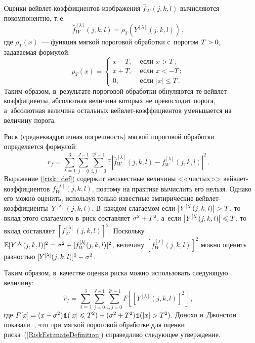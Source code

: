 \begin{multicols}{2}
Оценки вейвлет-коэффициентов изображения $\hat{f}_W(j,k,l)$
вычисляются покомпонентно, т.\,е.
$$
\hat{f}^{[\lambda]}_W(j,k,l)=\rho_T(Y^{[\lambda]}(j,k,l))\,,
$$
где $\rho_T(x)$~--- функция мягкой пороговой обработки с~порогом $T\hm>0$, 
задаваемая формулой:
\begin{equation*}
    \label{soft_function}
        \rho_T(x)=
            \begin{cases}
                x-T, &\mbox{ если }x > T\,;\\
                x+T, &\mbox{ если }x < -T\,;\\
                0, &\mbox{ если } \left|x\right|  \leqslant T\,.
            \end{cases}
\end{equation*}
Таким образом, в~результате пороговой обработки обнуляются те 
вейв\-лет-ко\-эф\-фи\-ци\-ен\-ты, абсолютная величина которых не превосходит порога, 
а~абсолютная величина остальных вейв\-лет-ко\-эф\-фи\-ци\-ен\-тов 
уменьшается на величину порога.

Риск (среднеквадратичная погрешность) мягкой пороговой обработки 
определяется формулой:
\begin{equation}
    \label{risk_def}
        r_f= \sum\limits_{\lambda=1}^{3}\sum\limits_{j=0}^{J-1}
        \sum\limits_{i,j=0}^{2^j-1}{\mathbb{E}\left|\hat{f}^{[\lambda]}_W(j,k,l)
        -f^{[\lambda]}_W(j,k,l)\right|^2}\,.
\end{equation}
Выражение (\ref{risk_def}) содержит неизвестные величины 
<<чистых>> вейв\-лет-ко\-эф\-фи\-ци\-ен\-тов $f^{[\lambda]}_W(j,k,l)$, 
поэтому на практике вычислить его нельзя. Однако его можно оценить, используя 
только известные эмпирические вейв\-лет-ко\-эф\-фи\-ци\-ен\-ты~$Y^{[\lambda]}(j,k,l)$. 
В~каждом слагаемом если $\left|Y^{[\lambda]}(j,k,l)\right|\hm>T$, 
то вклад этого слагаемого в~риск со\-став\-ля\-ет $\sigma^2\hm+T^2$, 
а~если $\left|Y^{[\lambda]}(j,k,l)\right|\hm\leqslant T$, то вклад 
со\-став\-ля\-ет $[f^{[\lambda]}_W(j,k,l)]^2$. Поскольку $\mathbb{E}[Y^{[\lambda]}(j,k,l)]^2
\hm=\sigma^2+[f^{[\lambda]}_W(j,k,l)]^2$, величину $[f^{[\lambda]}_W(j,k,l)]^2$ 
можно оценить разностью $[Y^{[\lambda]}(j,k,l)]^2\hm-\sigma^2$.

Таким образом, в~качестве оценки риска можно использовать следующую величину:
\begin{equation}
\label{RiskEstimateDefinition}
\hat{r}_f=\sum\limits_{\lambda=1}^{3}\sum\limits_{j=0}^{J-1}
\sum\limits_{i,j=0}^{2^j-1}F[[Y^{[\lambda]}(j,k,l)]^2]\,,
\end{equation}
где $F[x]=(x-\sigma^2)\Ik(|x|\hm\leqslant
T^2)\hm+(\sigma^2\hm+T^2)\Ik(|x|\hm>T^2).$ Донохо и~Джонстон
показали~\cite{DonJ2, DonJ}, что при мягкой пороговой обработке для
оценки риска~(\ref{RiskEstimateDefinition}) справедливо следующее
утверждение. 


\end{multicols}
